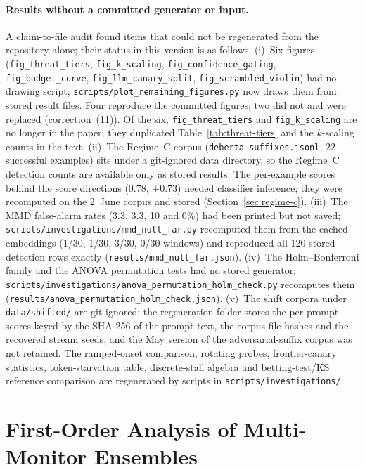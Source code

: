 \documentclass{article}
\begin{document}
\paragraph{Results without a committed generator or input.} A claim-to-file audit found items that could not be regenerated from the repository alone; their status in this version is as follows. (i)~Six figures (\texttt{fig\_threat\_tiers}, \texttt{fig\_k\_scaling}, \texttt{fig\_confidence\_gating}, \texttt{fig\_budget\_curve}, \texttt{fig\_llm\_canary\_split}, \texttt{fig\_scrambled\_violin}) had no drawing script; \texttt{scripts/plot\_remaining\_figures.py} now draws them from stored result files. Four reproduce the committed figures; two did not and were replaced (correction~(11)). Of the six, \texttt{fig\_threat\_tiers} and \texttt{fig\_k\_scaling} are no longer in the paper; they duplicated Table~\ref{tab:threat-tiers} and the $k$-scaling counts in the text. (ii)~The Regime~C corpus (\texttt{deberta\_suffixes.jsonl}, 22 successful examples) sits under a git-ignored data directory, so the Regime~C detection counts are available only as stored results. The per-example scores behind the score directions (0.78, $+0.73$) needed classifier inference; they were recomputed on the 2~June corpus and stored (Section~\ref{sec:regime-c}). (iii)~The MMD false-alarm rates (3.3, 3.3, 10 and 0\%) had been printed but not saved; \texttt{scripts/investigations/mmd\_null\_far.py} recomputed them from the cached embeddings (1/30, 1/30, 3/30, 0/30 windows) and reproduced all 120 stored detection rows exactly (\texttt{results/mmd\_null\_far.json}). (iv)~The Holm--Bonferroni family and the ANOVA permutation tests had no stored generator; \texttt{scripts/investigations/anova\_permutation\_holm\_check.py} recomputes them (\texttt{results/anova\_permutation\_holm\_check.json}). (v)~The shift corpora under \texttt{data/shifted/} are git-ignored; the regeneration folder stores the per-prompt scores keyed by the SHA-256 of the prompt text, the corpus file hashes and the recovered stream seeds, and the May version of the adversarial-suffix corpus was not retained. The ramped-onset comparison, rotating probes, frontier-canary statistics, token-starvation table, discrete-stall algebra and betting-test/KS reference comparison are regenerated by scripts in \texttt{scripts/investigations/}.

\section{First-Order Analysis of Multi-Monitor Ensembles}
\label{app:first-order}
\end{document}
